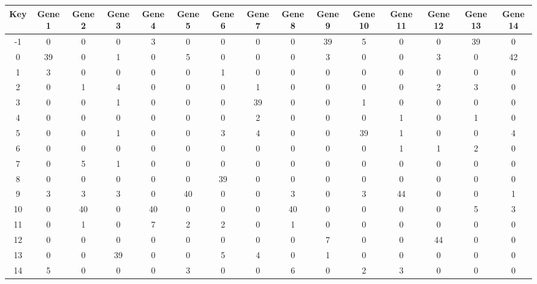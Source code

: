 \begin{tabular}{|c|c|c|c|c|c|c|c|c|c|c|c|c|c|c|}
\hline
Key & Gene 1 & Gene 2 & Gene 3 & Gene 4 & Gene 5 & Gene 6 & Gene 7 & Gene 8 & Gene 9 & Gene 10 & Gene 11 & Gene 12 & Gene 13 & Gene 14 \\
\hline
-1 & 0 & 0 & 0 & 3 & 0 & 0 & 0 & 0 & 39 & 5 & 0 & 0 & 39 & 0 \\
0 & 39 & 0 & 1 & 0 & 5 & 0 & 0 & 0 & 3 & 0 & 0 & 3 & 0 & 42 \\
1 & 3 & 0 & 0 & 0 & 0 & 1 & 0 & 0 & 0 & 0 & 0 & 0 & 0 & 0 \\
2 & 0 & 1 & 4 & 0 & 0 & 0 & 1 & 0 & 0 & 0 & 0 & 2 & 3 & 0 \\
3 & 0 & 0 & 1 & 0 & 0 & 0 & 39 & 0 & 0 & 1 & 0 & 0 & 0 & 0 \\
4 & 0 & 0 & 0 & 0 & 0 & 0 & 2 & 0 & 0 & 0 & 1 & 0 & 1 & 0 \\
5 & 0 & 0 & 1 & 0 & 0 & 3 & 4 & 0 & 0 & 39 & 1 & 0 & 0 & 4 \\
6 & 0 & 0 & 0 & 0 & 0 & 0 & 0 & 0 & 0 & 0 & 1 & 1 & 2 & 0 \\
7 & 0 & 5 & 1 & 0 & 0 & 0 & 0 & 0 & 0 & 0 & 0 & 0 & 0 & 0 \\
8 & 0 & 0 & 0 & 0 & 0 & 39 & 0 & 0 & 0 & 0 & 0 & 0 & 0 & 0 \\
9 & 3 & 3 & 3 & 0 & 40 & 0 & 0 & 3 & 0 & 3 & 44 & 0 & 0 & 1 \\
10 & 0 & 40 & 0 & 40 & 0 & 0 & 0 & 40 & 0 & 0 & 0 & 0 & 5 & 3 \\
11 & 0 & 1 & 0 & 7 & 2 & 2 & 0 & 1 & 0 & 0 & 0 & 0 & 0 & 0 \\
12 & 0 & 0 & 0 & 0 & 0 & 0 & 0 & 0 & 7 & 0 & 0 & 44 & 0 & 0 \\
13 & 0 & 0 & 39 & 0 & 0 & 5 & 4 & 0 & 1 & 0 & 0 & 0 & 0 & 0 \\
14 & 5 & 0 & 0 & 0 & 3 & 0 & 0 & 6 & 0 & 2 & 3 & 0 & 0 & 0 \\
\hline
\end{tabular}